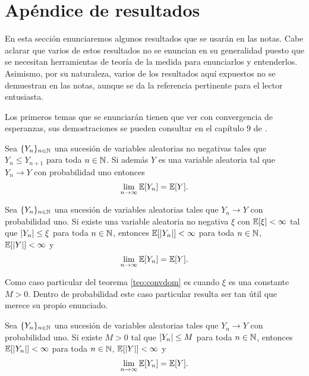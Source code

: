 \chapter{Apéndice de resultados}

\noindent En esta sección enunciaremos algunos resultados que se usarán en las notas. Cabe aclarar que varios de estos resultados no se enuncian en su generalidad puesto que se necesitan herramientas de teoría de la medida para enunciarlos y entenderlos. Asimismo, por su naturaleza, varios de los resultados aquí expuestos no se demuestran en las notas, aunque se da la referencia pertinente para el lector entusiasta.

Los primeros temas que se enunciarán tienen que ver con convergencia de esperanzas, sus demostraciones se pueden consultar en el capítulo 9 de \cite{JacodProtter02}.

\begin{theorem} \label{teo:convmon}
    Sea $\{Y_n\}_{n \in \mathbb{N}}$ una sucesión de variables aleatorias no negativas tales que $Y_n \leq Y_{n+1}$ para toda $n \in \mathbb{N}$. Si además $Y$ es una variable aleatoria tal que $Y_n \to Y$ con probabilidad uno entonces 
    \[
        \lim_{n \to \infty} \mathbb{E}[Y_n] = \mathbb{E}[Y].    
    \]
\end{theorem}

\begin{theorem} \label{teo:convdom}
    Sea $\{Y_n\}_{n \in \mathbb{N}}$ una sucesión de variables aleatorias tales que $Y_n \to Y$ con probabilidad uno. Si existe una variable aleatoria no negativa $\xi$ con $\mathbb{E}[\xi] < \infty$ tal que $\left\lvert Y_n \right\rvert \leq \xi$ para toda $n \in \mathbb{N}$, entonces $\mathbb{E}[\left\lvert Y_n \right\rvert] < \infty$ para toda $n \in \mathbb{N}$, $\mathbb{E}[\left\lvert Y \right\rvert] < \infty$ y 
    \[
        \lim_{n \to \infty} \mathbb{E}[Y_n] = \mathbb{E}[Y].    
    \]
\end{theorem}

Como caso particular del teorema \ref{teo:convdom} es cuando $\xi$ es una constante $M > 0$. Dentro de probabilidad este caso particular resulta ser tan útil que merece su propio enunciado.

\begin{corollary} \label{teo:convaco}
    Sea $\{Y_n\}_{n \in \mathbb{N}}$ una sucesión de variables aleatorias tales que $Y_n \to Y$ con probabilidad uno. Si existe $M > 0$ tal que $\left\lvert Y_n \right\rvert \leq M$ para toda $n \in \mathbb{N}$, entonces $\mathbb{E}[\left\lvert Y_n \right\rvert] < \infty$ para toda $n \in \mathbb{N}$, $\mathbb{E}[\left\lvert Y \right\rvert] < \infty$ y 
    \[
        \lim_{n \to \infty} \mathbb{E}[Y_n] = \mathbb{E}[Y].    
    \]
\end{corollary}

